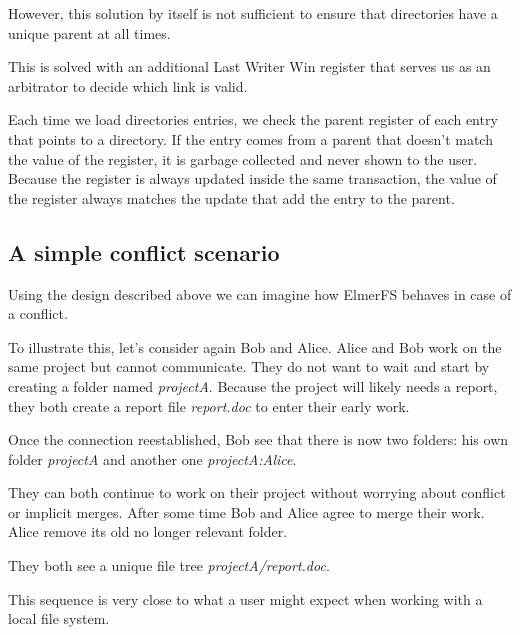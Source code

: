 \documentclass[sigconf,anonymous,10pt]{acmart}
\begin{document}
However, this solution by itself is not sufficient to ensure that directories have a
unique parent at all times.

This is solved with an additional Last Writer Win register that serves us as
an arbitrator to decide which link is valid.

Each time we load directories  entries, we check the parent register of each
entry that points to a directory. If the entry comes from a parent that doesn’t
match the value of the register, it is garbage collected and never shown to the user.
Because the register is always updated inside the same transaction, the
value of the register always matches the update that add the entry
to the parent.

\subsection{A simple conflict scenario}

Using the design described above we can imagine how ElmerFS behaves in case
of a conflict.

To illustrate this, let's consider again Bob and Alice. Alice and Bob work
on the same project but cannot communicate. They do not want to wait and start by creating a
folder named \textit{projectA}. Because the project will likely needs a report,
they both create a report file \textit{report.doc} to enter their early work.

Once the connection reestablished, Bob see that there is now two folders:
his own folder \textit{projectA} and another one \textit{projectA:Alice}.

They can both continue to work on their project without worrying about
conflict or implicit merges. After some time Bob and Alice agree to merge
their work. Alice remove its old no longer relevant folder.

They both see a unique file tree \textit{projectA/report.doc}.

This sequence is very close to what a user might expect when working with
a local file system.
\end{document}
